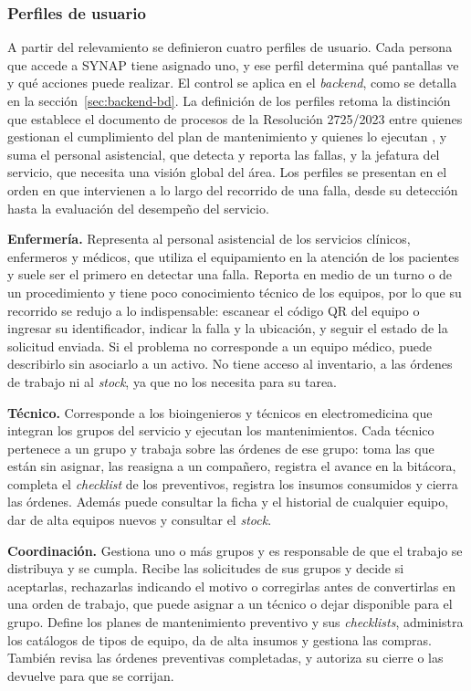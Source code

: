 \documentclass[10pt]{article}
\begin{document}
\subsubsection{Perfiles de usuario}
\label{sec:perfiles-usuario}
A partir del relevamiento se definieron cuatro perfiles de usuario. Cada persona que accede a SYNAP tiene asignado uno, y ese perfil determina qué pantallas ve y qué acciones puede realizar. El control se aplica en el \textit{backend}, como se detalla en la sección~\ref{sec:backend-bd}. La definición de los perfiles retoma la distinción que establece el documento de procesos de la Resolución 2725/2023 entre quienes gestionan el cumplimiento del plan de mantenimiento y quienes lo ejecutan \cite{res_2725_2023}, y suma el personal asistencial, que detecta y reporta las fallas, y la jefatura del servicio, que necesita una visión global del área. Los perfiles se presentan en el orden en que intervienen a lo largo del recorrido de una falla, desde su detección hasta la evaluación del desempeño del servicio.

\textbf {Enfermería.} Representa al personal asistencial de los servicios clínicos, enfermeros y médicos, que utiliza el equipamiento en la atención de los pacientes y suele ser el primero en detectar una falla. Reporta en medio de un turno o de un procedimiento y tiene poco conocimiento técnico de los equipos, por lo que su recorrido se redujo a lo indispensable: escanear el código QR del equipo o ingresar su identificador, indicar la falla y la ubicación, y seguir el estado de la solicitud enviada. Si el problema no corresponde a un equipo médico, puede describirlo sin asociarlo a un activo. No tiene acceso al inventario, a las órdenes de trabajo ni al \textit{stock}, ya que no los necesita para su tarea.

\textbf {Técnico.} Corresponde a los bioingenieros y técnicos en electromedicina que integran los grupos del servicio y ejecutan los mantenimientos. Cada técnico pertenece a un grupo y trabaja sobre las órdenes de ese grupo: toma las que están sin asignar, las reasigna a un compañero, registra el avance en la bitácora, completa el \textit{checklist} de los preventivos, registra los insumos consumidos y cierra las órdenes. Además puede consultar la ficha y el historial de cualquier equipo, dar de alta equipos nuevos y consultar el \textit{stock}.

\textbf {Coordinación.} Gestiona uno o más grupos y es responsable de que el trabajo se distribuya y se cumpla. Recibe las solicitudes de sus grupos y decide si aceptarlas, rechazarlas indicando el motivo o corregirlas antes de convertirlas en una orden de trabajo, que puede asignar a un técnico o dejar disponible para el grupo. Define los planes de mantenimiento preventivo y sus \textit{checklists}, administra los catálogos de tipos de equipo, da de alta insumos y gestiona las compras. También revisa las órdenes preventivas completadas, y autoriza su cierre o las devuelve para que se corrijan.
\end{document}
